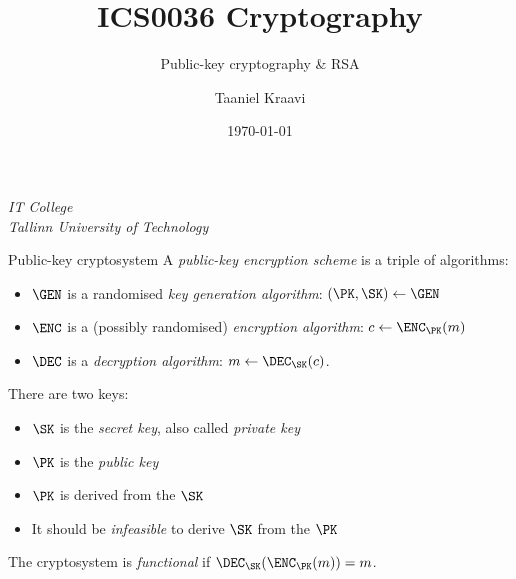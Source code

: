 \graphicspath{ {../../images/} }
\usetikzlibrary{external}

\usepackage{fancyvrb}

\title{ICS0036 Cryptography}
\subtitle{Public-key cryptography \& RSA}
\date{\today}
\author{Taaniel Kraavi}
\institute%
{%
  \textit{IT College}\\
  \textit{Tallinn University of Technology}
}


\begin{frame}
  \titlepage
\end{frame}

\begin{frame}{Public-key cryptosystem}
  A \emph{public-key encryption scheme} is a triple of algorithms:
  \begin{itemize}[<+(1)->]
    \item $\GEN$ is a randomised \emph{key generation algorithm}: $(\PK,\SK)\gets\GEN$
    \item $\ENC$ is a (possibly randomised) \emph{encryption algorithm}: $c\gets\ENC_\PK(m)$
    \item $\DEC$ is a \emph{decryption algorithm}: $m\gets\DEC_\SK(c)$.
  \end{itemize}

  \pause
  There are two keys:
  \begin{itemize}[<+(1)->]
    \item $\SK$ is the \emph{secret key}, also called \emph{private key}
    \item $\PK$ is the \emph{public key}
    \item $\PK$ is derived from the $\SK$
    \item It should be \emph{infeasible} to derive $\SK$ from the $\PK$
  \end{itemize}

  \pause
  The cryptosystem is \emph{functional} if $\DEC_\SK(\ENC_\PK(m))=m$.
\end{frame}

